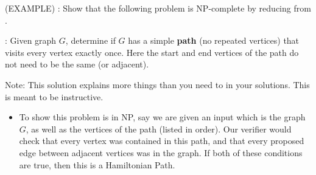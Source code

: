 \begin{questions}

  \question (EXAMPLE) \HP: 
  Show that the following problem is NP-complete by reducing from \HC.

  \HP: Given graph $G$, determine if $G$ has a simple {\bf path} (no repeated
  vertices) that visits every vertex exactly once. Here the start and end
  vertices of the path do not need to be the same (or adjacent).
  \begin{solution}
    Note: This solution explains more things than you need to in your
    solutions. This is meant to be instructive.

    \begin{itemize}
      \item To show this problem is in NP, say we are given an input which is
        the graph $G$, as well as the vertices of the path (listed in order).
        Our verifier would check that every vertex was contained in this path,
        and that every proposed edge between adjacent vertices was in the
        graph. If both of these conditions are true, then this is a
        Hamiltonian Path.


\end{itemize}
\end{solution}
\end{questions}
